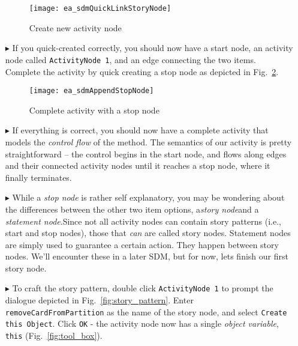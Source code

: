 \begin{itemize}
\begin{figure}[htp]
\begin{center}
  \texttt{[image: ea\_sdmQuickLinkStoryNode]}
  \caption{Create new activity node}  
  \label{fig:sdm_new_activity_node}
\end{center}
\end{figure}

\item[$\blacktriangleright$] If you quick-created correctly, you should now have a start node, an activity node called \texttt{ActivityNode 1}, and an edge
connecting the two items. Complete the activity by quick creating a stop node as depicted in Fig.~\ref{fig:sdm_stop_node}.

\begin{figure}[htp]
\begin{center}
  \texttt{[image: ea\_sdmAppendStopNode]}
  \caption{Complete activity with a stop node}  
  \label{fig:sdm_stop_node}
\end{center}
\end{figure}

\vspace{0.5cm}

\item[$\blacktriangleright$] If everything is correct, you should now have a complete activity that models the \emph{control flow} of the method. 
The semantics of our activity is pretty straightforward -- the control begins in the start node, and flows along edges and their connected activity nodes until
it reaches a stop node, where it finally terminates. 

\vspace{0.5cm}

\item[$\blacktriangleright$] While a \emph{stop node} is rather self explanatory, you may be wondering about the differences between the other two item options,
a\emph{story node}and a \emph{statement node}.Since not all activity nodes can contain story patterns (i.e., start
and stop nodes), those that \emph{can} are called story nodes. Statement nodes are simply used to guarantee a certain action. They happen between story nodes.
We'll encounter these in a later SDM, but for now, lets finish our first story node.

\vspace{0.5cm}

\item[$\blacktriangleright$] To craft the story pattern, double click \texttt{ActivityNode 1} to prompt the dialogue depicted in
Fig.~\ref{fig:story_pattern}. Enter \texttt{removeCardFromPartition} as the name of the story node, and select \texttt{Create this Object}.  Click
\texttt{OK} - the activity node now has a single \emph{object variable}, \texttt{this} (Fig.~\ref{fig:tool_box}).


\end{itemize}
